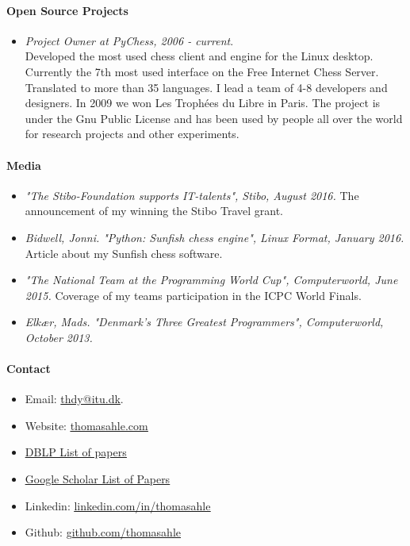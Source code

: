 \documentclass[11pt]{article}
\begin{document}
\paragraph{Open Source Projects}
\begin{itemize}
   \item[]
   \emph{Project Owner at PyChess, 2006 - current}.
   \\
   Developed the most used chess client and engine for the Linux desktop. Currently the 7th most used interface on the Free Internet Chess Server. Translated to more than 35 languages. I lead a team of 4-8 developers and designers. In 2009 we won Les Trophées du Libre in Paris. The project is under the Gnu Public License and has been used by people all over the world for research projects and other experiments.
\end{itemize}


\paragraph{Media}
\begin{itemize}
   \item[]
      \emph{"The Stibo-Foundation supports IT-talents", Stibo, August 2016.}
      The announcement of my winning the Stibo Travel grant.
   \item[]
      \emph{Bidwell, Jonni.
         "Python: Sunfish chess engine", Linux Format, January 2016.}
      Article about my Sunfish chess software.
   \item[]
      \emph{"The National Team at the Programming World Cup", Computerworld, June 2015.}
      Coverage of my teams participation in the ICPC World Finals.
   \item[]
      \emph{Elkær, Mads.
         "Denmark's Three Greatest Programmers", Computerworld, October 2013.}
      
\end{itemize}

\paragraph{Contact}
\begin{itemize}
   \item[]
      Email: \href{mailto:thdy@itu.dk}{thdy@itu.dk}.
   \item[]
      Website: \href{http://www.thomasahle.com}{\underline{thomasahle.com}}
   \item[]
      \href{https://dblp1.uni-trier.de/pers/hd/a/Ahle:Thomas_D=}{\underline{DBLP List of papers}}
   \item[]
      \href{https://scholar.google.dk/citations?user=aRiVoYgAAAAJ}{\underline{Google Scholar List of Papers}}
   \item[]
      Linkedin: \href{https://www.linkedin.com/in/thomasahle/}{\underline{linkedin.com/in/thomasahle}}
   \item[]
      Github: \href{https://github.com/thomasahle}{\underline{github.com/thomasahle}}
\end{itemize}
\end{document}
